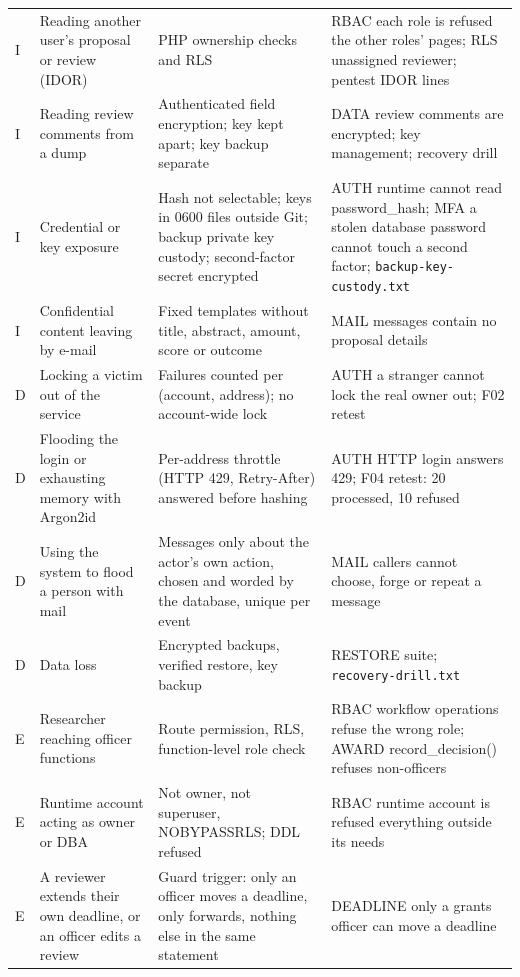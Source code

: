 \documentclass[10pt,a4paper]{article}
\newcommand{\code}[1]{\nolinkurl{#1}}
\begin{document}
\begin{center}
\begin{longtable}{@{}L{0.85cm}L{3.5cm}L{4.5cm}L{5.0cm}@{}}
I & Reading another user's proposal or review (IDOR) & PHP ownership checks and RLS & RBAC each role is refused the other roles' pages; RLS unassigned reviewer; pentest IDOR lines\\
I & Reading review comments from a dump & Authenticated field encryption; key kept apart; key backup separate & DATA review comments are encrypted; key management; recovery drill\\
I & Credential or key exposure & Hash not selectable; keys in 0600 files outside Git; backup private key custody; second-factor secret encrypted & AUTH runtime cannot read password\_hash; MFA a stolen database password cannot touch a second factor; \code{backup-key-custody.txt}\\
I & Confidential content leaving by e-mail & Fixed templates without title, abstract, amount, score or outcome & MAIL messages contain no proposal details\\
D & Locking a victim out of the service & Failures counted per (account, address); no account-wide lock & AUTH a stranger cannot lock the real owner out; F02 retest\\
D & Flooding the login or exhausting memory with Argon2id & Per-address throttle (HTTP 429, Retry-After) answered before hashing & AUTH HTTP login answers 429; F04 retest: 20 processed, 10 refused\\
D & Using the system to flood a person with mail & Messages only about the actor's own action, chosen and worded by the database, unique per event & MAIL callers cannot choose, forge or repeat a message\\
D & Data loss & Encrypted backups, verified restore, key backup & RESTORE suite; \code{recovery-drill.txt}\\
E & Researcher reaching officer functions & Route permission, RLS, function-level role check & RBAC workflow operations refuse the wrong role; AWARD record\_decision() refuses non-officers\\
E & Runtime account acting as owner or DBA & Not owner, not superuser, NOBYPASSRLS; DDL refused & RBAC runtime account is refused everything outside its needs\\
E & A reviewer extends their own deadline, or an officer edits a review & Guard trigger: only an officer moves a deadline, only forwards, nothing else in the same statement & DEADLINE only a grants officer can move a deadline\\
\bottomrule\end{longtable}\end{center}
\end{document}
